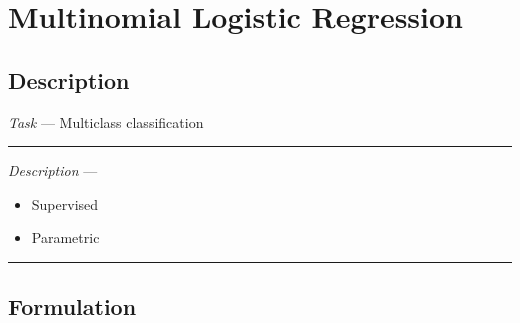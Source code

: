 \section{Multinomial Logistic Regression}
\subsection*{Description}
\emph{Task} --- Multiclass classification

{\color{lightgray}\hrule height 0.001mm}

\emph{Description} --- 
\begin{itemize}
    \item Supervised
    \item Parametric
\end{itemize}

{\color{black}\hrule height 0.001mm}

\subsection*{Formulation}

